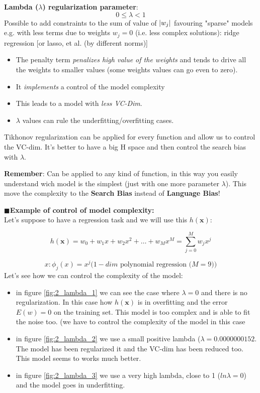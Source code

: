 \documentclass[../main.tex]{subfiles}
\begin{document}
\textbf{Lambda ($\lambda$) regularization parameter}: 
$$ 0\leq \lambda < 1$$
Possible to add constraints to the sum of value of $\lvert w_j\rvert$ favouring "sparse" models e.g. with less terms due to weights $w_j=0$ (i.e. less complex solutions): ridge regression [or lasso, et al. (by different norms)]

\begin{itemize}
    \item The penalty term \emph{penalizes high value of the weights} and tends to drive all the weights to smaller values (some weights values can go even to zero).
    \item It \emph{implements} a control of the model complexity
    \item This leads to a model with \emph{less VC-Dim}.
    \item $\lambda$ values can rule the underfitting/overfitting cases.
\end{itemize}
Tikhonov regularization can be applied for every function and allow us to control the VC-dim. It's better to have a big H space and then control the search bias with $\lambda$.

\textbf{Remember}: Can be applied to any kind of function, in this way you easily understand wich model is the simplest (just with one more parameter $\lambda$). This move the complexity to the \textbf{Search Bias} instead of \textbf{Language Bias}!

\newpage
\noindent$\blacksquare$\textbf{Example of control of model complexity:}\\
Let's suppose to have a regression task and we will use this $h(\mathbf{x})$:

$$ h(\mathbf{x}) = w_0 + w_1x + w_2x^2 + \dots + w_Mx^M = \sum_{j = 0}^M w_jx^j$$

$$ x : \phi_j(x) = x^j \text{($1-dim$ polynomial regression ($M = 9$))}$$
Let's see how we can control the complexity of the model:
\begin{itemize}
    \item in figure \ref{fig:2_lambda_1} we can see the case where $\lambda = 0$ and there is no regularization. In this case how $h(\mathbf{x})$ is in overfitting and the error $E(w) = 0$ on the training set. This model is too complex and is able to fit the noise too. (we have to control the complexity of the model in this case
    
    \item in figure \ref{fig:2_lambda_2} we use a small positive lambda ($\lambda = 0.0000000152$. The model has been regularized it and the VC-dim has been reduced too. This model seems to works much better.
    
    \item in figure \ref{fig:2_lambda_3} we use a very high lambda, close to 1 ($ln\lambda = 0$) and the model goes in underfitting.
\end{itemize}
\end{document}
